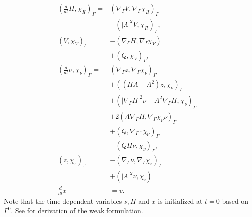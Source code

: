 \begin{subequations}
\begin{align}
\label{eq:WE_weak_form}
\left( \frac{d}{dt}H, \chi _{H} \right)_{\Gamma } =&  \left( \nabla _{\Gamma } V, \nabla _{\Gamma }\chi _{H} \right) _{\Gamma } \nonumber \\
                                                   &- \left( \left\lvert A \right\rvert ^2 V, \chi _{H} \right) _{\Gamma },   \\
\left( V, \chi _{V} \right)_{\Gamma } =& -\left( \nabla _{\Gamma } H, \nabla _{\Gamma } \chi _{V} \right) \nonumber \\
 & + \left( Q, \chi _{V} \right)_{\Gamma },   \\
\left( \frac{d}{dt} \nu , \chi _{\nu } \right)_{\Gamma } =& \left( \nabla _{\Gamma }z, \nabla _{\Gamma } \chi _{\nu } \right) _{\Gamma }\nonumber   \\
 & + \left( ( HA - A^2  )z,\chi_\nu  \right)_{\Gamma }   \nonumber \\
 & + \left( \left\lvert \nabla _{\Gamma } H \right\rvert^2 \nu + A^2\nabla _{\Gamma } H, \chi _{\nu }  \right)_{\Gamma} \nonumber  \\
 & + 2 \left( A \nabla _{\Gamma } H, \nabla _{\Gamma } \chi _{\nu } \nu  \right)_{\Gamma} \nonumber    \\
 &  + \left( Q, \nabla _{\Gamma } \cdot \chi _{\nu }  \right)_{\Gamma } \nonumber  \\
  &- \left( QH\nu , \chi _{\nu } \right) _{\Gamma},\\
\left( z, \chi _{z} \right) _{\Gamma }  =& - \left( \nabla _{\Gamma } \nu , \nabla _{\Gamma } \chi _{z} \right)_{\Gamma} \nonumber \\
 & + \left( \left\lvert A \right\rvert ^2 \nu , \chi _{z} \right) \\
\frac{d}{dt}x &= v
.\end{align}
\end{subequations}
Note that the time dependent variables $\nu, H $ and $x$ is initialized at $t=0$  based on $\Gamma ^{0}$. See \cite{kovacs2021convergent} for derivation of the weak formulation.














